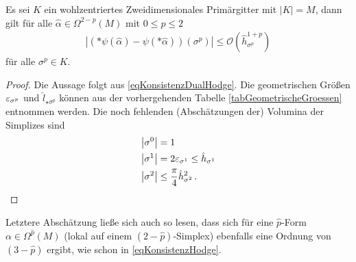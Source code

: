   \begin{satz}
    Es sei \( K \) ein wohlzentriertes Zweidimensionales Primärgitter mit \( |K| = M \),
    dann gilt für alle \( \hat\alpha\in\Omega^{2-p}(M) \) mit \( 0 \le p \le 2\)
    \begin{align}
      \left| \left( *\psi(\hat\alpha) - \psi(*\hat\alpha) \right)(\sigma^{p})\right| \le \mathcal{O}\left(\hat{h}_{\sigma^{p}}^{1+p}\right)
    \end{align}
    für alle \( \sigma^{p}\in K \).
  \end{satz}
  \begin{proof}
    Die Aussage folgt aus \eqref{eqKonsistenzDualHodge}. 
    Die geometrischen Größen \( \varepsilon_{\sigma^{p}} \) und \( \hat{l}_{\star\sigma^{p}} \) können aus der vorhergehenden Tabelle \eqref{tabGeometrischeGroessen} entnommen werden.
    Die noch fehlenden (Ab\-schät\-zun\-gen der) Volumina der Simplizes sind
    \begin{align}
    \begin{aligned}
       \left| \sigma^{0} \right| &= 1 \\
       \left| \sigma^{1} \right| &= 2\varepsilon_{\sigma^{1}} \le \hat{h}_{\sigma^{1}} \\
       \left| \sigma^{2} \right| &\le \frac{\pi}{4} \hat{h}_{\sigma^{2}}^{2} \,\text{.}
    \end{aligned}
    \end{align}
  \end{proof}
  Letztere Abschätzung ließe sich auch so lesen, dass sich für eine \( \hat{p} \)-Form \( \alpha\in\Omega^{\hat{p}}(M) \) 
  (lokal auf einem \( (2-\hat{p}) \)-Simplex) ebenfalls eine Ordnung von \( (3-\hat{p}) \) ergibt, wie schon in \eqref{eqKonsistenzHodge}.


